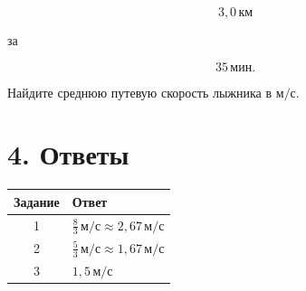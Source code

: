 \documentclass[a4paper,12pt]{article}
\newcommand{\unit}[1]{\,\text{#1}}
\begin{document}
\[
3{,}0\unit{км}
\]

за

\[
35\unit{мин}.
\]

Найдите среднюю путевую скорость лыжника в $\text{м/с}$.


\clearpage

\section*{4. Ответы}

\renewcommand{\arraystretch}{1.35}

\begin{table}[h]
\centering

\begin{tabularx}{\linewidth}{@{}cX@{}}

\toprule

\textbf{Задание}
&
\textbf{Ответ}
\\

\midrule

1
&
$\displaystyle
\frac{8}{3}\unit{м/с}
\approx
2{,}67\unit{м/с}$
\\

2
&
$\displaystyle
\frac{5}{3}\unit{м/с}
\approx
1{,}67\unit{м/с}$
\\

3
&
$1{,}5\unit{м/с}$
\\

\bottomrule

\end{tabularx}

\end{table}
\end{document}
